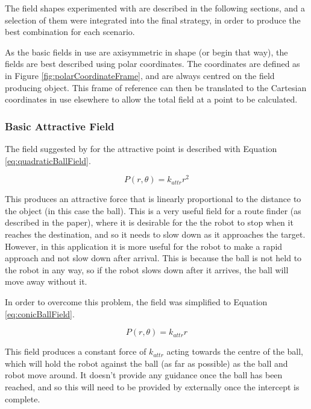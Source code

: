 \documentclass[10pt]{article}
\begin{document}
The field shapes experimented with are described in the following sections, and
a selection of them were integrated into the final strategy, in order to produce
the best combination for each scenario.

As the basic fields in use are axisymmetric in shape (or begin that way), the
fields are best described using polar coordinates. The coordinates are defined
as in Figure \ref{fig:polarCoordinateFrame}, and are always centred on the field
producing object. This frame of reference can then be translated to the
Cartesian coordinates in use elsewhere to allow the total field at a point to be
calculated.

\subsubsection{Basic Attractive Field\label{sub:Basic-Attractive-Field}}

The field suggested by \cite{intelligentAlgorithmPathPlanning} for the
attractive point is described with Equation \ref{eq:quadraticBallField}.

\begin{equation}
P(r,\theta)=k_{attr}r^{2}\label{eq:quadraticBallField}
\end{equation}

This produces an attractive force that is linearly proportional to the distance
to the object (in this case the ball). This is a very useful field for a route
finder (as described in the paper), where it is desirable for the the robot to
stop when it reaches the destination, and so it needs to slow down as it
approaches the target. However, in this application it is more useful for the
robot to make a rapid approach and not slow down after arrival. This is because
the ball is not held to the robot in any way, so if the robot slows down after
it arrives, the ball will move away without it.

In order to overcome this problem, the field was simplified to Equation
\ref{eq:conicBallField}.

\begin{equation}
P(r,\theta)=k_{attr}r\label{eq:conicBallField}
\end{equation}

This field produces a constant force of $k_{attr}$ acting towards the centre of
the ball, which will hold the robot against the ball (as far as possible) as the
ball and robot move around. It doesn't provide any guidance once the ball has
been reached, and so this will need to be provided by externally once
the intercept is complete.
\end{document}
